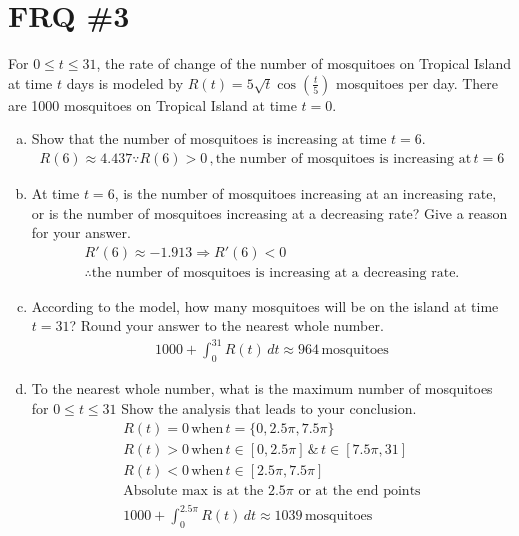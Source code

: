 \documentclass[11pt,letterpaper]{article}
\begin{document}
\section*{FRQ \#3}
 For $0\leq t \leq 31$, the rate of change of the number of mosquitoes on Tropical Island at time $t$ days is modeled by $R(t)=5\sqrt t \cos(\frac{t}{5})$ mosquitoes per day. There are 1000 mosquitoes on Tropical Island at time $t = 0$.
 \begin{enumerate}[a.)]
     \item Show that the number of mosquitoes is increasing at time $t = 6$.
     \begin{align*}
         R(6)\approx 4.437 \because  R(6)>0 \, , \text{the number of mosquitoes is increasing at} \, t=6
     \end{align*}
     \item At time $t = 6$, is the number of mosquitoes increasing at an increasing rate, or is the number of mosquitoes increasing at a decreasing rate? Give a reason for your answer.
     \begin{align*}
         R'(6) \approx -1.913 \Rightarrow  R'(6)<0  \\
         \therefore \text{the number of mosquitoes is increasing at a decreasing rate}.
     \end{align*}
     \item According to the model, how many mosquitoes will be on the island at time $t = 31$? Round your answer to the nearest whole number.
     \begin{align*}
         1000 +\int_{0}^{31} R(t)\, dt \approx 964 \, \text{mosquitoes}
     \end{align*}
     \item  To the nearest whole number, what is the maximum number of mosquitoes for
$0\leq t \leq 31$ Show the analysis that leads to your conclusion.
\begin{align*}
    R(t)=0 \, \text{when} \, t=\{0,2.5\pi,7.5\pi\}\\
    R(t)>0 \, \text{when} \, t\in[0,2.5\pi] \, \& \, t\in[7.5\pi, 31] \\
    R(t)<0 \, \text{when} \, t\in[2.5\pi,7.5\pi]\\
    \text{Absolute max is at the 2.5$\pi$ or at the end points}\\
    1000 +\int_{0}^{2.5\pi} R(t)\, dt \approx 1039 \, \text{mosquitoes} 
\end{align*}
\end{enumerate}
\end{document}
